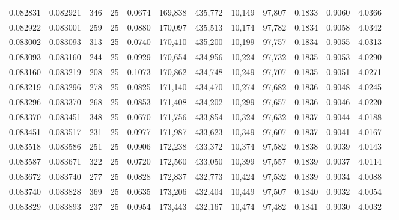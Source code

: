 \begin{tabular}{rrrrrrrrrrrrr}
0.082831 & 0.082921 &   346 &  25 &                                     0.0674 & 169,838 & 435,772 &  10,149 &  97,807 & 0.1833 & 0.9060 & 4.0366 \\
0.082922 & 0.083001 &   259 &  25 &                                     0.0880 & 170,097 & 435,513 &  10,174 &  97,782 & 0.1834 & 0.9058 & 4.0342 \\
0.083002 & 0.083093 &   313 &  25 &                                     0.0740 & 170,410 & 435,200 &  10,199 &  97,757 & 0.1834 & 0.9055 & 4.0313 \\
0.083093 & 0.083160 &   244 &  25 &                                     0.0929 & 170,654 & 434,956 &  10,224 &  97,732 & 0.1835 & 0.9053 & 4.0290 \\
0.083160 & 0.083219 &   208 &  25 &                                     0.1073 & 170,862 & 434,748 &  10,249 &  97,707 & 0.1835 & 0.9051 & 4.0271 \\
0.083219 & 0.083296 &   278 &  25 &                                     0.0825 & 171,140 & 434,470 &  10,274 &  97,682 & 0.1836 & 0.9048 & 4.0245 \\
0.083296 & 0.083370 &   268 &  25 &                                     0.0853 & 171,408 & 434,202 &  10,299 &  97,657 & 0.1836 & 0.9046 & 4.0220 \\
0.083370 & 0.083451 &   348 &  25 &                                     0.0670 & 171,756 & 433,854 &  10,324 &  97,632 & 0.1837 & 0.9044 & 4.0188 \\
0.083451 & 0.083517 &   231 &  25 &                                     0.0977 & 171,987 & 433,623 &  10,349 &  97,607 & 0.1837 & 0.9041 & 4.0167 \\
0.083518 & 0.083586 &   251 &  25 &                                     0.0906 & 172,238 & 433,372 &  10,374 &  97,582 & 0.1838 & 0.9039 & 4.0143 \\
0.083587 & 0.083671 &   322 &  25 &                                     0.0720 & 172,560 & 433,050 &  10,399 &  97,557 & 0.1839 & 0.9037 & 4.0114 \\
0.083672 & 0.083740 &   277 &  25 &                                     0.0828 & 172,837 & 432,773 &  10,424 &  97,532 & 0.1839 & 0.9034 & 4.0088 \\
0.083740 & 0.083828 &   369 &  25 &                                     0.0635 & 173,206 & 432,404 &  10,449 &  97,507 & 0.1840 & 0.9032 & 4.0054 \\
0.083829 & 0.083893 &   237 &  25 &                                     0.0954 & 173,443 & 432,167 &  10,474 &  97,482 & 0.1841 & 0.9030 & 4.0032 \\

\end{tabular}
